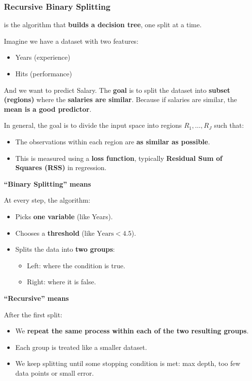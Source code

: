 \subsubsection{Recursive Binary Splitting}

 is the algorithm that \textbf{builds a decision tree}, one split at a time.

\highspace
Imagine we have a dataset with two features:
\begin{itemize}
    \item Years (experience)
    \item Hits (performance)
\end{itemize}
And we want to predict Salary. The \textbf{goal} is to split the dataset into \textbf{subset (regions)} where the \textbf{salaries are similar}. Because if salaries are similar, the \textbf{mean is a good predictor}.

\highspace
In general, the goal is to divide the input space into regions $R_1, \dots, R_J$ such that:
\begin{itemize}
    \item The observations within each region are \textbf{as similar as possible}.
    \item This is measured using a \textbf{loss function}, typically \textbf{Residual Sum of Squares (RSS)} in regression.
\end{itemize}

\highspace
\begin{flushleft}
    \textcolor{Green3}{ \textbf{``Binary Splitting'' means}}
\end{flushleft}
At every step, the algorithm:
\begin{itemize}
    \item Picks \textbf{one variable} (like Years).
    \item Chooses a \textbf{threshold} (like $\text{Years} < 4.5$).
    \item Splits the data into \textbf{two groups}:
    \begin{itemize}
        \item Left: where the condition is true.
        \item Right: where it is false.
    \end{itemize}
\end{itemize}

\highspace
\begin{flushleft}
    \textcolor{Green3}{ \textbf{``Recursive'' means}}
\end{flushleft}
After the first split:
\begin{itemize}
    \item We \textbf{repeat the same process within each of the two resulting groups}.
    \item Each group is treated like a smaller dataset.
    \item We keep splitting until some stopping condition is met: max depth, too few data points or small error.
\end{itemize}

